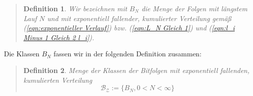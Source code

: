 \documentclass[11pt,oneside,a4paper]{scrreprt}
\newtheorem{defi}{Definition}
\begin{document}
\begin{quote}
	\begin{defi}\label{def:B_N}
	Wir bezeichnen mit $B_N$ die Menge der Folgen mit längstem Lauf $N$ und mit exponentiell fallender, kumulierter Verteilung gemäß (\ref{eqn:exponentieller Verlauf}) bzw. (\ref{eqn:L_N Gleich 1}) und (\ref{eqn:l_i Minus 1 Gleich 2 l_i}). 	
\end{defi}
\end{quote}

\noindent Die Klassen $B_N$ fassen wir in der folgenden Definition zusammen:
\begin{quote}
	\begin{defi}\label{def:MengeDerZufaelligeBitfolge} Menge der Klassen der Bitfolgen mit exponentiell fallenden, kumulierten Verteilung	
		\begin{equation}\label{eqn:MengeDerZufaelligeBitfolge}
		\mathcal{B_Z} := \{B_N, 0< N<\infty \}
		\end{equation}		
\end{defi}
\end{quote}
\end{document}
